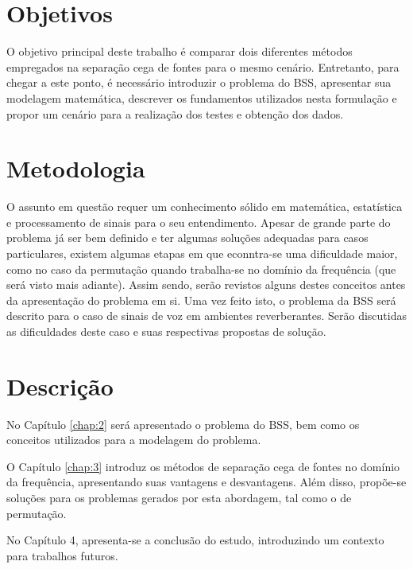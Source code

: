 \section{Objetivos}

O objetivo principal deste trabalho é comparar dois diferentes métodos empregados na separação cega de fontes para o mesmo cenário. Entretanto, para chegar a este ponto, é necessário introduzir o problema do BSS, apresentar sua modelagem matemática, descrever os fundamentos utilizados nesta formulação e propor um cenário para a realização dos testes e obtenção dos dados.


\section{Metodologia}

O assunto em questão requer um conhecimento sólido em matemática, estatística e processamento de sinais para o seu entendimento. Apesar de grande parte do problema já ser bem definido e ter algumas soluções adequadas para casos particulares, existem algumas etapas em que econntra-se uma dificuldade maior, como no caso da permutação quando trabalha-se no domínio da frequência (que será visto mais adiante). Assim sendo, serão revistos alguns destes conceitos antes da apresentação do problema em si. Uma vez feito isto, o problema da BSS será descrito para o caso de sinais de voz em ambientes reverberantes. Serão discutidas as dificuldades deste caso e suas respectivas propostas de solução.


\section{Descrição}

No Capítulo \ref{chap:2} será apresentado o problema do BSS, bem como os conceitos utilizados para a modelagem do problema.

O Capítulo \ref{chap:3} introduz os métodos de separação cega de fontes no domínio da frequência, apresentando suas vantagens e desvantagens. Além disso, propõe-se soluções para os problemas gerados por esta abordagem, tal como o de permutação.

No Capítulo 4, apresenta-se a conclusão do estudo, introduzindo um contexto para trabalhos futuros.

